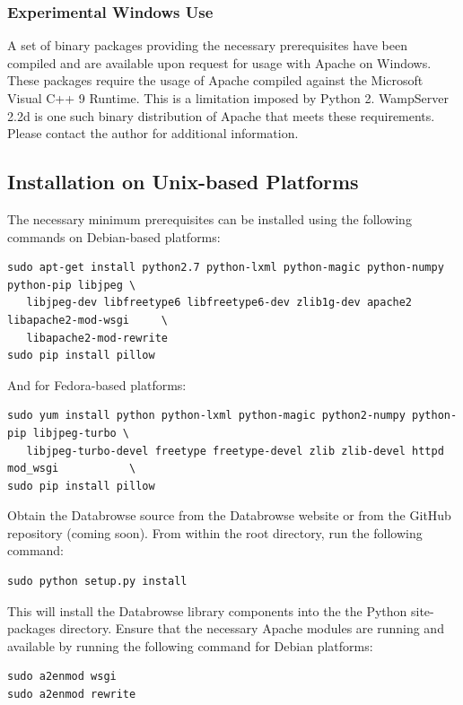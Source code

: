 \documentclass[10pt]{article}
\begin{document}
\subsubsection{Experimental Windows Use}

A set of binary packages providing the necessary prerequisites have been compiled and are available upon request for usage with Apache on Windows.  These packages require the usage of Apache compiled against the Microsoft Visual C++ 9 Runtime.  This is a limitation imposed by Python 2.  WampServer 2.2d is one such binary distribution of Apache that meets these requirements.  Please contact the author for additional information. 

\subsection{Installation on Unix-based Platforms}

The necessary minimum prerequisites can be installed using the following commands on Debian-based platforms:

\begin{verbatim}
sudo apt-get install python2.7 python-lxml python-magic python-numpy python-pip libjpeg \
   libjpeg-dev libfreetype6 libfreetype6-dev zlib1g-dev apache2 libapache2-mod-wsgi     \
   libapache2-mod-rewrite
sudo pip install pillow
\end{verbatim}

And for Fedora-based platforms:

\begin{verbatim}
sudo yum install python python-lxml python-magic python2-numpy python-pip libjpeg-turbo \
   libjpeg-turbo-devel freetype freetype-devel zlib zlib-devel httpd mod_wsgi           \
sudo pip install pillow
\end{verbatim}

Obtain the Databrowse source from the Databrowse website or from the GitHub repository (coming soon).  From within the root directory, run the following command:

\begin{verbatim}
sudo python setup.py install
\end{verbatim}

This will install the Databrowse library components into the the Python site-packages directory.  Ensure that the necessary Apache modules are running and available by running the following command for Debian platforms:

\begin{verbatim}
sudo a2enmod wsgi
sudo a2enmod rewrite
\end{verbatim}
\end{document}
